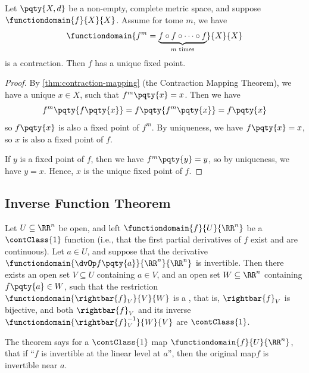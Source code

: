 \begin{corollary}
    Let \(\pqty{X, d}\) be a non-empty, complete metric space, and suppose \(\functiondomain{f}{X}{X}\). Assume for tome \(m\), we have
    \[
        \functiondomain{f^m = \underbrace{f \circ f \circ \cdots \circ f}_{m \text{ times}}}{X}{X}
    \]
    is a contraction. Then \(f\) has a unique fixed point.
\end{corollary}

\begin{proof}
    By \autoref{thm:contraction-mapping} (the Contraction Mapping Theorem), we have a unique \(x \in X\), such that \(f^m\pqty{x} = x\). Then we have
    \[
        f^{m} \pqty{f\pqty{x}} = f\pqty{f^{m} \pqty{x}} = f\pqty{x}
    \]
    so \(f\pqty{x}\) is also a fixed point of \(f^m\). By uniqueness, we have \(f\pqty{x} = x\), so \(x\) is also a fixed point of \(f\).

    If \(y\) is a fixed point of \(f\), then we have \(f^m\pqty{y} = y\), so by uniqueness, we have \(y = x\). Hence, \(x\) is the unique fixed point of \(f\).
\end{proof}

\subsection{Inverse Function Theorem}

\begin{theorem}
    Let \(U \subseteq \RR^n\) be open, and left \(\functiondomain{f}{U}{\RR^n}\) be a \(\contClass{1}\) function (i.e., that the first partial derivatives of \(f\) exist and are continuous). Let \(a \in U\), and suppose that the derivative \(\functiondomain{\dvOp f\pqty{a}}{\RR^n}{\RR^n}\) is invertible. Then there exists an open set \(V \subseteq U\) containing \(a \in V\), and an open set \(W \subseteq \RR^n\) containing \(f\pqty{a} \in W\), such that the restriction \(\functiondomain{\rightbar{f}_V}{V}{W}\) is a , that is, \(\rightbar{f}_V\) is bijective, and both \(\rightbar{f}_V\) and its inverse \(\functiondomain{\rightbar{f}_V^{-1}}{W}{V}\) are \(\contClass{1}\).
\end{theorem}

\begin{remark}
    The theorem says for a \(\contClass{1}\) map \(\functiondomain{f}{U}{\RR^n}\), that if ``\(f\) is invertible at the linear level at \(a\)'', then the original map\(f\) is invertible near \(a\).
\end{remark}


